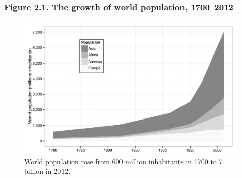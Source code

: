 \documentclass[t]{beamer}\usepackage[]{graphicx}\usepackage[]{color}
\newenvironment{knitrout}{}{} %
\begin{document}
\begin{frame}[label=Figure_2_1b]
\frametitle{Figure 2.1. The growth of world population, 1700--2012}
\begin{figure}[t]
\begin{minipage}[b]{\textwidth}
\centering
\begin{knitrout}\footnotesize
{}\color{fgcolor}

{\centering \includegraphics[width=1\linewidth]{figures/bw/Figure_2_1b} 

}



\end{knitrout}
\caption{World population rose from 600 million inhabitants in 1700 to 7 billion in 2012.}
\end{minipage}
\end{figure}
\end{frame}
\end{document}
